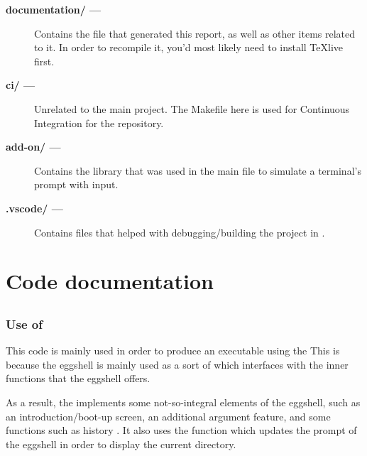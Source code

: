 \documentclass[12pt, a4paper]{report}
\begin{document}
            \begin{description}
                \item[\bf{documentation/} ---]
                    Contains the  file that generated this report,
                    as well as other items related to it. In order to recompile it,
                    you'd most likely need to install \TeX{}live first.
                \item[\bf{ci/} ---]
                    Unrelated to the main project. The Makefile here is used for 
                    Continuous Integration for the  repository.
                \item[\bf{add-on/} ---]
                    Contains the  library that was used in the 
                    main file to simulate a terminal's prompt with input.
                \item[\bf{.vscode/} ---]
                    Contains files that helped with debugging/building the project
                    in .
            \end{description}

    \clearpage

    \chapter{Code documentation}
        \section{}
            \subsection{Use of }
                This code is mainly used in order to produce an executable
                using the  This is because the eggshell is
                mainly used as a sort of  which interfaces with
                the inner functions that the eggshell offers.

                As a result, the  implements some not-so-integral
                elements of the eggshell, such as an introduction/boot-up
                screen, an additional  argument feature, and some
                 functions such as history . It also uses the function 
                which updates the prompt of the eggshell in order to display
                the current directory.
\end{document}
